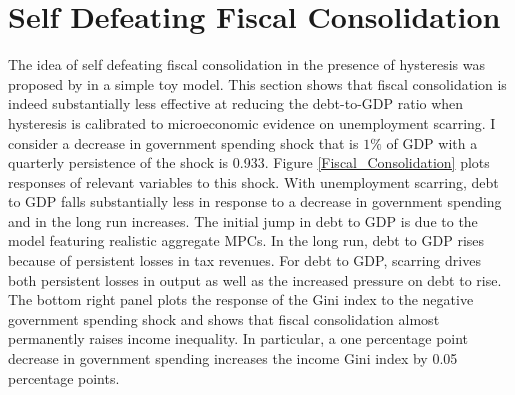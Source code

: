 \section{Self Defeating Fiscal Consolidation}

The idea of self defeating fiscal consolidation in the presence of hysteresis was proposed by \cite{FATAS2018} in a simple toy model. This section shows that fiscal consolidation is indeed substantially less effective at reducing the debt-to-GDP ratio when hysteresis is calibrated to microeconomic evidence on unemployment scarring. I consider a decrease in government spending shock that is $1\%$ of GDP with a quarterly persistence of the shock is 0.933. Figure \ref{Fiscal_Consolidation} plots responses of relevant variables to this shock. With unemployment scarring, debt to GDP falls substantially less in response to a decrease in government spending and in the long run increases. The initial jump in debt to GDP is due to the model featuring realistic aggregate MPCs. In the long run, debt to GDP rises because of persistent losses in tax revenues. For debt to GDP, scarring drives both persistent losses in output as well as the increased pressure on debt to rise. The bottom right panel plots the response of the Gini index to the negative government spending shock and shows that fiscal consolidation almost permanently raises income inequality. In particular, a one percentage point decrease in government spending increases the income Gini index by 0.05 percentage points.



